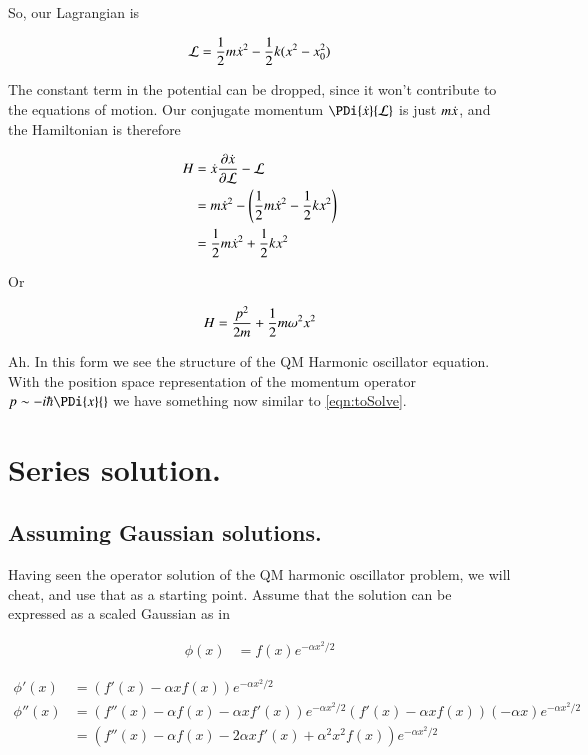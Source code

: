 \documentclass{article}
\begin{document}
So, our Lagrangian is

\begin{align*}
\mathcal{L} = \frac{1}{2}m \dot{x}^2 - \frac{1}{2} k (x^2 - x_0^2)
\end{align*}

The constant term in the potential can be dropped, since it won't contribute to the equations of motion.  Our conjugate momentum $\PDi{\xdot}{\LL}$ is just $m \dot{x}$, and the Hamiltonian
is therefore

\begin{align*}
H 
&= \dot{x} \frac{\partial{\dot{x}}}{\partial {\mathcal{L}}} - \mathcal{L} \\
&= m \dot{x}^2  - \left( \frac{1}{2}m \dot{x}^2 - \frac{1}{2} k x^2 \right) \\
&= \frac{1}{2} m \dot{x}^2  + \frac{1}{2} k x^2 \\
\end{align*}

Or

\begin{align*}
H &= \frac{p^2}{2 m } + \frac{1}{2} m \omega^2 x^2 \\
\end{align*}

Ah.  In this form we see the structure of the QM Harmonic oscillator equation.  With the position space representation of the momentum operator $p \sim -i \hbar \PDi{x}{}$ we have
something now similar to \ref{eqn:toSolve}.

\section{ Series solution. }

\subsection{ Assuming Gaussian solutions. }

Having seen the operator solution of the QM harmonic oscillator problem, we will cheat, and use that as a starting point.  Assume that
the solution can be expressed as a scaled Gaussian as in

\begin{align}
\phi(x) &= f(x) e^{ - \alpha x^2/2 }
\end{align}

\begin{align*}
\phi'(x) &= \left( f'(x) - \alpha x f(x) \right) e^{ - \alpha x^2/2 } \\
\phi''(x)
&=
\left( f''(x) - \alpha f(x) -\alpha x f'(x) \right) e^{ - \alpha x^2/2 }
\left( f'(x) - \alpha x f(x) \right) (-\alpha x) e^{ - \alpha x^2/2 } \\
&=
\left( f''(x) - \alpha f(x) - 2 \alpha x f'(x) + \alpha^2 x^2 f(x) \right) e^{ - \alpha x^2/2 }
\end{align*}
\end{document}
